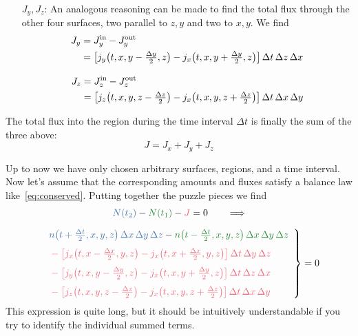 \documentclass[a4paper,12pt,%
onecolumn,oneside,titlepage,%
british%
]{memoir}
\newcommand*{\incr}{\Delta}%
\renewcommand*{\|}[1][]{\nonscript\:#1\vert\nonscript\:\mathopen{}}
\newcommand*{\yN}{N}
\newcommand*{\yJ}{J}
\newcommand*{\Dt}{\incr t}
\newcommand*{\Dx}{\incr x}
\newcommand*{\Dy}{\incr y}
\newcommand*{\Dz}{\incr z}
\newcommand*{\Dth}{\tfrac{\incr t}{2}}
\newcommand*{\Dxh}{\tfrac{\incr x}{2}}
\newcommand*{\Dyh}{\tfrac{\incr y}{2}}
\newcommand*{\Dzh}{\tfrac{\incr z}{2}}
\begin{document}
\begin{itemize}
\begin{itemize}
  \item[$\yJ_{y}, \yJ_{z}$:] An analogous reasoning can be made to find the total flux through the other four surfaces, two parallel to $z,y$ and two to $x,y$. We find
    \begin{align}
      \label{eq:Fyflux}
      \begin{split}
        \yJ_{y} &= \yJ_{y}^{\text{in}} - \yJ_{y}^{\text{out}}
        \\&= \bigl[ j_{y}\bigl(t, x, y-\Dyh, z\bigr) - j_{x}\bigl(t, x, y+\Dyh, z\bigr)\bigr]
        \,\Dt\,\Dz\,\Dx
      \end{split}
      \\[3\jot]
      \label{eq:Fzflux}
      \begin{split}
        \yJ_{z} &= \yJ_{z}^{\text{in}} - \yJ_{z}^{\text{out}}
        \\&= \bigl[ j_{z}\bigl(t, x, y, z-\Dzh\bigr) - j_{x}\bigl(t, x, y, z+\Dzh\bigr)\bigr]
        \,\Dt\,\Dx\,\Dy
      \end{split}
    \end{align}
  \end{itemize}
The total flux into the region during the time interval $\Dt$ is finally the sum of the three above:
\begin{equation}
  \label{eq:Fflux}
  \yJ = \yJ_{x} + \yJ_{y} + \yJ_{z}
\end{equation}
\end{itemize}

Up to now we have only chosen arbitrary surfaces, regions, and a time interval. Now let's assume that the corresponding amounts and fluxes satisfy a balance law like~\eqref{eq:conserved}. Putting together the puzzle pieces we find
\begin{multline*}
  \label{eq:balance_pieces}
    \mathcolor{bluepurple}{\yN(t_{2})} -\mathcolor{green}{\yN(t_{1})} - \mathcolor{red}{\yJ} = 0 \qquad     \Longrightarrow
    \\[2\jot]
    \left.\begin{aligned}
      &\mathcolor{bluepurple}{n\bigl(t+\Dth, x,y,z\bigr)\,\Dx\,\Dy\,\Dz}
      - \mathcolor{green}{n\bigl(t-\Dth, x,y,z\bigr)\,\Dx\,\Dy\,\Dz}
      \\[\jot]\quad&\color{red}-\bigl[ j_{x}\bigl(t, x-\Dxh, y, z\bigr) - j_{x}\bigl(t, x+\Dxh, y, z\bigr)\bigr]
      \,\Dt\,\Dy\,\Dz
      \\[\jot]\quad&\color{red}-\bigl[ j_{y}\bigl(t, x, y-\Dyh, z\bigr) - j_{x}\bigl(t, x, y+\Dyh, z\bigr)\bigr]
      \,\Dt\,\Dz\,\Dx
      \\[\jot]\quad&\color{red}-\bigl[ j_{z}\bigl(t, x, y, z-\Dzh\bigr) - j_{x}\bigl(t, x, y, z+\Dzh\bigr)\bigr]
      \,\Dt\,\Dx\,\Dy
    \end{aligned}\enspace\right\}=0
\end{multline*}
This expression is quite long, but it should be intuitively understandable if you try to identify the individual summed terms.
\end{document}
